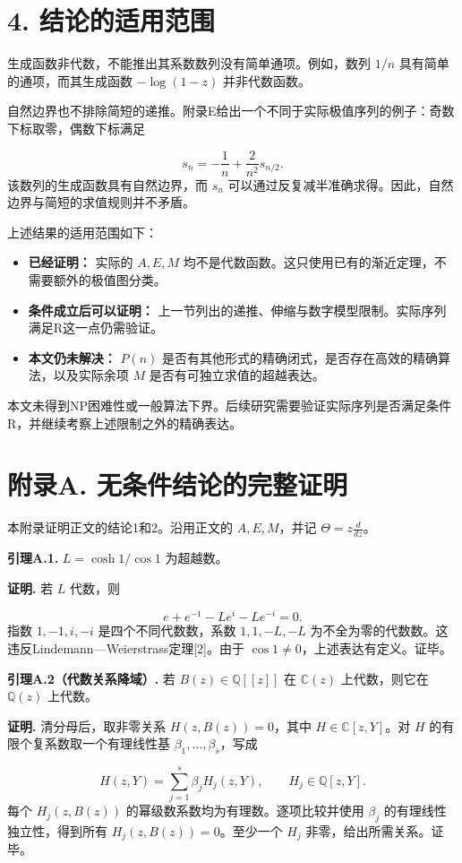 \documentclass[12pt,a4paper]{article}
\begin{document}
\section*{4. 结论的适用范围}
生成函数非代数，不能推出其系数数列没有简单通项。例如，数列 $1/n$ 具有简单的通项，而其生成函数 $-\log(1-z)$ 并非代数函数。

自然边界也不排除简短的递推。附录E给出一个不同于实际极值序列的例子：奇数下标取零，偶数下标满足

\[
s_n=-\frac1n+\frac{2}{n^2}s_{n/2}.
\]
该数列的生成函数具有自然边界，而 $s_n$ 可以通过反复减半准确求得。因此，自然边界与简短的求值规则并不矛盾。

上述结果的适用范围如下：

\begin{itemize}[leftmargin=*]
\item \textbf{已经证明：} 实际的 $A,E,M$ 均不是代数函数。这只使用已有的渐近定理，不需要额外的极值图分类。
\item \textbf{条件成立后可以证明：} 上一节列出的递推、伸缩与数字模型限制。实际序列满足R这一点仍需验证。
\item \textbf{本文仍未解决：} $P(n)$ 是否有其他形式的精确闭式，是否存在高效的精确算法，以及实际余项 $M$ 是否有可独立求值的超越表达。
\end{itemize}
本文未得到NP困难性或一般算法下界。后续研究需要验证实际序列是否满足条件R，并继续考察上述限制之外的精确表达。

\clearpage
\section*{附录A. 无条件结论的完整证明}
本附录证明正文的结论1和2。沿用正文的 $A,E,M$，并记 $\Theta=z\frac{d}{dz}$。

\textbf{引理A.1.} $L=\cosh1/\cos1$ 为超越数。

\textbf{证明.} 若 $L$ 代数，则

\[
e+e^{-1}-Le^i-Le^{-i}=0.
\]
指数 $1,-1,i,-i$ 是四个不同代数数，系数 $1,1,-L,-L$ 为不全为零的代数数。这违反Lindemann—Weierstrass定理[2]。由于 $\cos1\ne0$，上述表达有定义。证毕。

\textbf{引理A.2（代数关系降域）.} 若 $B(z)\in\mathbb Q[[z]]$ 在 $\mathbb C(z)$ 上代数，则它在 $\mathbb Q(z)$ 上代数。

\textbf{证明.} 清分母后，取非零关系 $H(z,B(z))=0$，其中 $H\in\mathbb C[z,Y]$。对 $H$ 的有限个复系数取一个有理线性基 $\beta_1,\ldots,\beta_s$，写成

\[
H(z,Y)=\sum_{j=1}^s\beta_jH_j(z,Y),\qquad H_j\in\mathbb Q[z,Y].
\]
每个 $H_j(z,B(z))$ 的幂级数系数均为有理数。逐项比较并使用 $\beta_j$ 的有理线性独立性，得到所有 $H_j(z,B(z))=0$。至少一个 $H_j$ 非零，给出所需关系。证毕。
\end{document}
